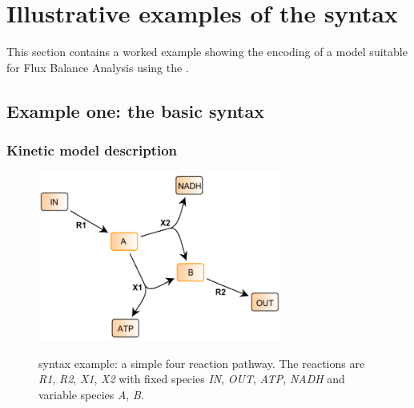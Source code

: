 
\section{Illustrative examples of the \FBC syntax}
\label{examples}

This section contains a worked example showing the encoding of a model suitable for Flux Balance Analysis using the \FBCPackage.

\subsection{Example one: the basic \FBC syntax}
\label{examples1}
\subsubsection{Kinetic model description}
\begin{figure}[h]
  \centering
  \includegraphics[width=8cm]{examples/spec-example1.pdf}\\
  \caption{\FBC syntax example: a simple four reaction pathway. The
  reactions are \textit{R1}, \textit{R2}, \textit{X1}, \textit{X2} with
  fixed species \textit{IN}, \textit{OUT}, \textit{ATP}, \textit{NADH} and
  variable species \textit{A}, \textit{B}.}
  \label{fig:example1}
\end{figure}

